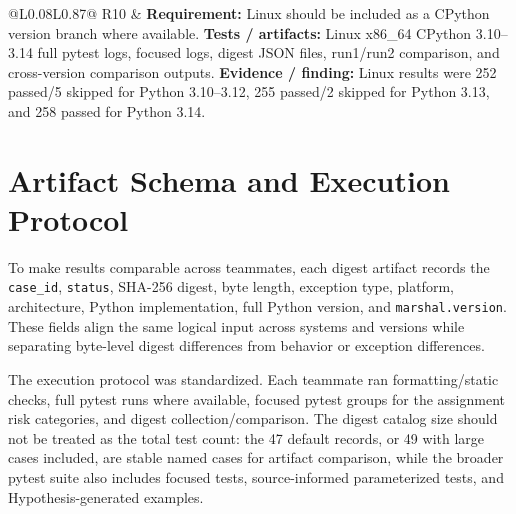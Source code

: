 \documentclass[10pt,a4paper]{article}
\begin{document}
\begin{longtable}{@{}L{0.08\linewidth}L{0.87\linewidth}@{}}
R10 &
\textbf{Requirement:} Linux should be included as a CPython version branch where available. \newline
\textbf{Tests / artifacts:} Linux x86\_64 CPython 3.10--3.14 full pytest logs, focused logs, digest JSON files, run1/run2 comparison, and cross-version comparison outputs. \newline
\textbf{Evidence / finding:} Linux results were 252 passed/5 skipped for Python 3.10--3.12, 255 passed/2 skipped for Python 3.13, and 258 passed for Python 3.14. \\

\bottomrule
\end{longtable}
\endgroup

\section{Artifact Schema and Execution Protocol}

To make results comparable across teammates, each digest artifact records the \texttt{case\_id}, \texttt{status}, SHA-256 digest, byte length, exception type, platform, architecture, Python implementation, full Python version, and \texttt{marshal.version}. These fields align the same logical input across systems and versions while separating byte-level digest differences from behavior or exception differences.

The execution protocol was standardized. Each teammate ran formatting/static checks, full pytest runs where available, focused pytest groups for the assignment risk categories, and digest collection/comparison. The digest catalog size should not be treated as the total test count: the 47 default records, or 49 with large cases included, are stable named cases for artifact comparison, while the broader pytest suite also includes focused tests, source-informed parameterized tests, and Hypothesis-generated examples.

\begingroup
\small
\setlength{\tabcolsep}{5pt}
\renewcommand{\arraystretch}{1.10}
\end{document}
